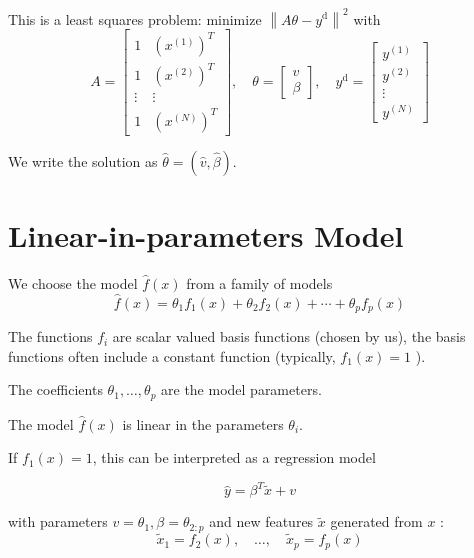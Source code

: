 This is a least squares problem: minimize $ \left\|A \theta-y^{\mathrm{d}}\right\|^{2} $ with
$$
A=\left[\begin{array}{cc}
1 & \left(x^{(1)}\right)^{T} \\
1 & \left(x^{(2)}\right)^{T} \\
\vdots & \vdots \\
1 & \left(x^{(N)}\right)^{T}
\end{array}\right], \quad \theta=\left[\begin{array}{c}
v \\
\beta
\end{array}\right], \quad y^{\mathrm{d}}=\left[\begin{array}{c}
y^{(1)} \\
y^{(2)} \\
\vdots \\
y^{(N)}
\end{array}\right]
$$

\begin{notation}
    We write the solution as $ \hat{\theta}=(\hat{v}, \hat{\beta}) $.
\end{notation}



\section{Linear-in-parameters Model}

\begin{problem}
    We choose the model $ \hat{f}(x) $ from a family of models
$$
\hat{f}(x)=\theta_{1} f_{1}(x)+\theta_{2} f_{2}(x)+\cdots+\theta_{p} f_{p}(x)
$$

The functions $ f_{i} $ are scalar valued basis functions (chosen by us), the basis functions often include a constant function (typically, $ f_{1}(x)=1 $ ). 

The coefficients $ \theta_{1}, \ldots, \theta_{p} $ are the model parameters.
\end{problem}

The model $ \hat{f}(x) $ is linear in the parameters $ \theta_{i} $.

\begin{corollary}
    If $ f_{1}(x)=1 $, this can be interpreted as a regression model

$$
\hat{y}=\beta^{T} \tilde{x}+v
$$

with parameters $ v=\theta_{1}, \beta=\theta_{2: p} $ and new features $ \tilde{x} $ generated from $ x $ :
$$
\tilde{x}_{1}=f_{2}(x), \quad \ldots, \quad \tilde{x}_{p}=f_{p}(x)
$$
\end{corollary}




